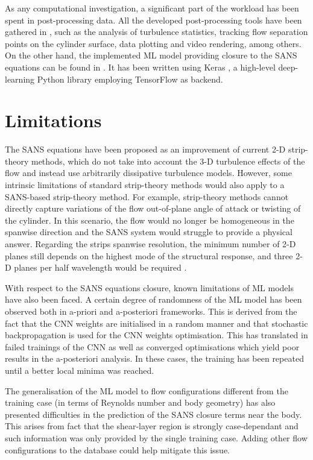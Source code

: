\documentclass[../main.tex]{subfiles}
\begin{document}
As any computational investigation, a significant part of the workload has been spent in post-processing data.
All the developed post-processing tools have been gathered in \cite{Font2018-postproc}, such as the analysis of turbulence statistics, tracking flow separation points on the cylinder surface, data plotting and video rendering, among others.
On the other hand, the implemented ML model providing closure to the SANS equations can be found in \cite{Font2019-sanspy}. 
It has been written using Keras \citep{Chollet2015}, a high-level deep-learning Python library employing TensorFlow \citep{Tensorflow} as backend.

\section{Limitations}

The SANS equations have been proposed as an improvement of current 2-D strip-theory methods, which do not take into account the 3-D turbulence effects of the flow and instead use arbitrarily dissipative turbulence models.
However, some intrinsic limitations of standard strip-theory methods would also apply to a SANS-based strip-theory method. 
For example, strip-theory methods cannot directly capture variations of the flow out-of-plane angle of attack or twisting of the cylinder.
In this scenario, the flow would no longer be homogeneous in the spanwise direction and the SANS system would struggle to provide a physical answer.
Regarding the strips spanwise resolution, the minimum number of 2-D planes still depends on the highest mode of the structural response, and three 2-D planes per half wavelength would be required \citep{Willden2004}.

With respect to the SANS equations closure, known limitations of ML models have also been faced.
A certain degree of randomness of the ML model has been observed both in a-priori and a-posteriori frameworks.
This is derived from the fact that the CNN weights are initialised in a random manner and that stochastic backpropagation is used for the CNN weights optimisation.
This has translated in failed trainings of the CNN as well as converged optimisations which yield poor results in the a-posteriori analysis.
In these cases, the training has been repeated until a better local minima was reached.

The generalisation of the ML model to flow configurations different from the training case (in terms of Reynolds number and body geometry) has also presented difficulties in the prediction of the SANS closure terms near the body.
This arises from fact that the shear-layer region is strongly case-dependant and such information was only provided by the single training case.
Adding other flow configurations to the database could help mitigate this issue.
\end{document}
